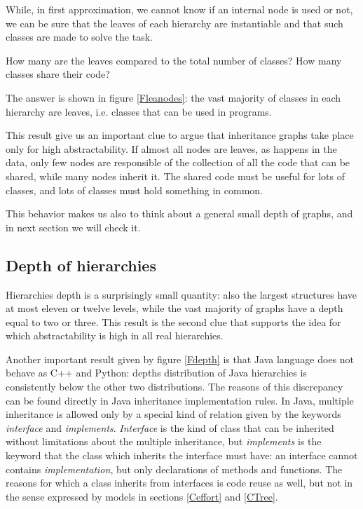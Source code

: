 While, in first approximation, we cannot know if an internal node is used or not, we can be sure that the leaves of each hierarchy are instantiable and that such classes are made to solve the task.

How many are the leaves compared to the total number of classes? How many classes share their code?

The answer is shown in figure \ref{Fleanodes}: the vast majority of classes in each hierarchy are leaves, i.e. classes that can be used in programs.

This result give us an important clue to argue that inheritance graphs take place only for high abstractability. If almost all nodes are leaves, as happens in the data, only few nodes are responsible of the collection of all the code that can be shared, while many nodes inherit it. The shared code must be useful for lots of classes, and lots of classes must hold something in common.

This behavior makes us also to think about a general small depth of graphs, and in next section we will check it.

\subsection{Depth of hierarchies}
Hierarchies depth is a surprisingly small quantity: also the largest structures have at most eleven or twelve levels, while the vast majority of graphs have a depth equal to two or three. This result is the second clue that supports the idea for which abstractability is high in all real hierarchies.

Another important result given by figure \ref{Fdepth} is that Java language does not behave as C++ and Python: depths distribution of Java hierarchies is consistently below the other two distributions. The reasons of this discrepancy can be found directly in Java inheritance implementation rules. In Java, multiple inheritance is allowed only by a special kind of relation given by the keywords \textit{interface} and \textit{implements}. \textit{Interface} is the kind of class that can be inherited without limitations about the multiple inheritance, but \textit{implements} is the keyword that the class which inherits the interface must have: an interface cannot contains \textit{implementation}, but only declarations of methods and functions. The reasons for which a class inherits from interfaces is code reuse as well, but not in the sense expressed by models in sections \ref{Ceffort} and \ref{CTree}.

